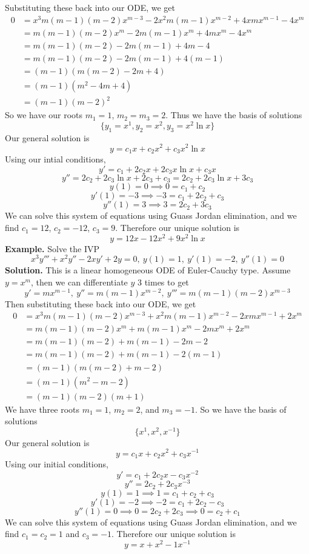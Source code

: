 \documentclass[openany]{report}
\begin{document}
    Substituting these back into our ODE, we get
    \begin{align*}
      0 &= x^3m(m-1)(m-2)x^{m-3} - 2x^2m(m-1)x^{m-2} + 4xmx^{m-1} - 4x^m\\
      &= m(m-1)(m-2)x^m - 2m(m-1)x^m + 4mx^m - 4x^m\\  
      &= m(m-1)(m-2) - 2m(m-1) + 4m - 4\\ 
      &= m(m-1)(m-2) - 2m(m-1) + 4(m-1)\\
      &= (m-1)(m(m-2) - 2m + 4)\\
      &= (m-1)(m^2 - 4m + 4)\\
      &= (m-1)(m-2)^2
    \end{align*}
    So we have our roots $m_1 = 1$, $m_2 = m_3 = 2$. Thus we have the basis of solutions
    \[\{y_1 = x^1, y_2 = x^2, y_3 = x^2\ln x\}\]
    Our general solution is 
    \[y = c_1x + c_2 x^2 + c_3 x^2\ln x\]
    Using our intial conditions,
    \[y' = c_1 + 2c_2x + 2c_3x\ln x + c_3x\]
    \[y'' = 2c_2 + 2c_3\ln x + 2c_3 + c_3 = 2c_2 + 2c_3\ln x + 3c_3\]
    \[y(1) = 0 \implies 0 = c_1 + c_2\]
    \[y'(1) = -3 \implies -3 = c_1 + 2c_2 + c_3\]
    \[y''(1) = 3 \implies 3 = 2c_2 + 3c_3\]
    We can solve this system of equations using Guass Jordan elimination, and we find $c_1 = 12$, $c_2 = -12$, $c_3 = 9$. Therefore our unique solution is
    \[y = 12x -12x^2 + 9 x^2\ln x\]
    \textbf{Example.} Solve the IVP 
    \[x^3y''' + x^2y'' - 2xy' + 2y = 0, \ y(1) = 1, \ y'(1) = -2, \ y''(1) = 0\]
    \textbf{Solution.} This is a linear homogeneous ODE of Euler-Cauchy type. Assume $y = x^m$, then we can differentiate $y$ 3 times to get
    \[y' = mx^{m-1}, \ y'' = m(m-1)x^{m-2}, \ y''' = m(m-1)(m-2)x^{m-3}\]
    Then substituting these back into our ODE, we get
    \begin{align*}
        0 &= x^3m(m-1)(m-2)x^{m-3} + x^2m(m-1)x^{m-2} - 2xmx^{m-1} + 2x^m\\
        &= m(m-1)(m-2)x^m + m(m-1)x^m - 2mx^m + 2x^m\\  
        &= m(m-1)(m-2) + m(m-1) - 2m - 2\\ 
        &= m(m-1)(m-2) + m(m-1) - 2(m-1)\\
        &= (m-1)(m(m-2) + m - 2)\\
        &= (m-1)(m^2 - m - 2)\\
        &= (m-1)(m-2)(m+1)
    \end{align*}
    We have three roots $m_1 = 1$, $m_2 = 2$, and $m_3 = -1$. So we have the basis of solutions
    \[\{x^1, x^2, x^{-1}\}\]
    Our general solution is
    \[y = c_1x + c_2x^2 + c_3x^{-1}\]
    Using our initial conditions,
    \[y' = c_1 + 2c_2x - c_3x^{-2}\]
    \[y'' = 2c_2 + 2c_3x^{-3} \]
    \[y(1) = 1 \implies 1 = c_1 + c_2 + c_3\]
    \[y'(1) = -2 \implies -2 = c_1 + 2c_2 - c_3\]
    \[y''(1) = 0 \implies 0 = 2c_2 + 2c_3 \implies 0 = c_2 + c_1\]
    We can solve this system of equations using Guass Jordan elimination, and we find $c_1 = c_2 = 1$ and $c_3 = -1$. Therefore our unique solution is
    \[y = x +x^2 - 1x^{-1}\] 
\end{document}
